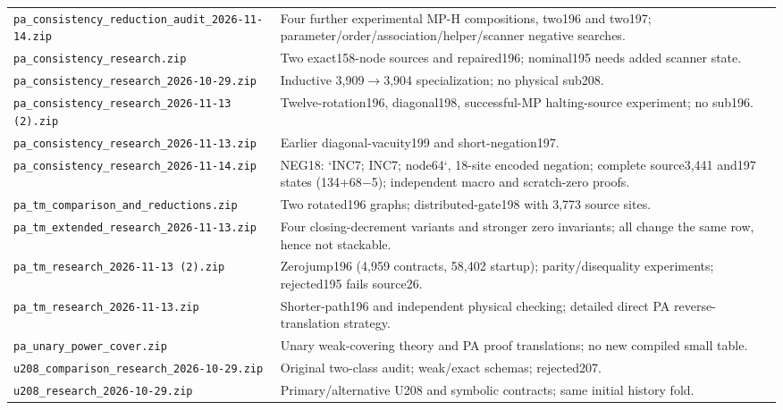 \begin{longtable}{@{}p{}p{}@{}}
\nolinkurl{pa_consistency_reduction_audit_2026-11-14.zip} & Four further experimental MP-H compositions, two196 and two197; parameter/order/association/helper/scanner negative searches. \\[4pt]
\nolinkurl{pa_consistency_research.zip} & Two exact158-node sources and repaired196; nominal195 needs added scanner state. \\[4pt]
\nolinkurl{pa_consistency_research_2026-10-29.zip} & Inductive 3,909$\to$3,904 specialization; no physical sub208. \\[4pt]
\nolinkurl{pa_consistency_research_2026-11-13 (2).zip} & Twelve-rotation196, diagonal198, successful-MP halting-source experiment; no sub196. \\[4pt]
\nolinkurl{pa_consistency_research_2026-11-13.zip} & Earlier diagonal-vacuity199 and short-negation197. \\[4pt]
\nolinkurl{pa_consistency_research_2026-11-14.zip} & NEG18: `INC7; INC7; node64`, 18-site encoded negation; complete source3,441 and197 states (134+68$-$5); independent macro and scratch-zero proofs. \\[4pt]
\nolinkurl{pa_tm_comparison_and_reductions.zip} & Two rotated196 graphs; distributed-gate198 with 3,773 source sites. \\[4pt]
\nolinkurl{pa_tm_extended_research_2026-11-13.zip} & Four closing-decrement variants and stronger zero invariants; all change the same row, hence not stackable. \\[4pt]
\nolinkurl{pa_tm_research_2026-11-13 (2).zip} & Zerojump196 (4,959 contracts, 58,402 startup); parity/disequality experiments; rejected195 fails source26. \\[4pt]
\nolinkurl{pa_tm_research_2026-11-13.zip} & Shorter-path196 and independent physical checking; detailed direct PA reverse-translation strategy. \\[4pt]
\nolinkurl{pa_unary_power_cover.zip} & Unary weak-covering theory and PA proof translations; no new compiled small table. \\[4pt]
\nolinkurl{u208_comparison_research_2026-10-29.zip} & Original two-class audit; weak/exact schemas; rejected207. \\[4pt]
\nolinkurl{u208_research_2026-10-29.zip} & Primary/alternative U208 and symbolic contracts; same initial history fold. \\[4pt]
\end{longtable}
\normalsize
\clearpage
